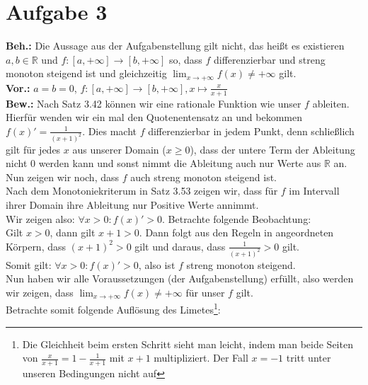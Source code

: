 \documentclass[12pt, a4paper]{article}
\begin{document}
\section*{Aufgabe 3}
\textbf{Beh.:} Die Aussage aus der Aufgabenstellung gilt nicht, das heißt es existieren \(a,b \in \mathbb{R}\) und \(f: [a,+\infty] \rightarrow [b,+\infty]\) so, dass \(f\) differenzierbar und streng monoton steigend ist und gleichzeitig \(\lim_{x \rightarrow +\infty} f(x) \ne +\infty\) gilt. \\
\textbf{Vor.:} \(a = b = 0\), \(f: [a,+\infty] \rightarrow [b,+\infty], x \mapsto \frac{x}{x+1}\) \\
\textbf{Bew.:} Nach Satz 3.42 können wir eine rationale Funktion wie unser \(f\) ableiten. Hierfür wenden wir ein mal den Quotenentensatz an und bekommen \(f(x)' = \frac{1}{(x+1)^2}\). Dies macht \(f\) differenzierbar in jedem Punkt, denn schließlich gilt für jedes \(x\) aus unserer Domain (\(x \ge 0\)), dass der untere Term der Ableitung nicht 0 werden kann und sonst nimmt die Ableitung auch nur Werte aus \(\mathbb{R}\) an.\\
Nun zeigen wir noch, dass \(f\) auch streng monoton steigend ist.\\
Nach dem Monotoniekriterum in Satz 3.53 zeigen wir, dass für \(f\) im Intervall ihrer Domain ihre Ableitung nur Positive Werte annimmt. \\
Wir zeigen also: \(\forall x > 0: f(x)' > 0\). Betrachte folgende Beobachtung: \\
Gilt \(x > 0\), dann gilt \(x + 1 > 0\). Dann folgt aus den Regeln in angeordneten Körpern, dass \((x + 1)^2 > 0\) gilt und daraus, dass \(\frac{1}{(x+1)^2} > 0\) gilt. \\
Somit gilt: \(\forall x > 0: f(x)' > 0\), also ist \(f\) streng monoton steigend. \\
Nun haben wir alle Voraussetzungen (der Aufgabenstellung) erfüllt, also werden wir zeigen, dass \(\lim_{x \rightarrow +\infty} f(x) \ne +\infty\) für unser \(f\) gilt. \\
Betrachte somit folgende Auflösung des Limetes\footnote{Die Gleichheit beim ersten Schritt sieht man leicht, indem man beide Seiten von \(\frac{x}{x+1} = 1 - \frac{1}{x+1}\) mit \(x+1\) multipliziert. Der Fall \(x = -1\) tritt unter unseren Bedingungen nicht auf}:
\end{document}
